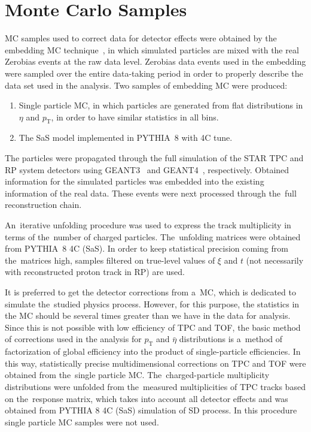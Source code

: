 \chapter{Monte Carlo Samples }\label{section:star_mc}
\ac{MC} samples used to correct data for detector effects were obtained by the embedding \ac{MC} technique~\cite{STAR:tpc}, in which  simulated particles are mixed with the real Zerobias events at the raw data level. Zerobias data events used in the embedding were sampled over the entire data-taking period in order to properly describe the data set used in the analysis.  Two samples of embedding MC were produced:
\begin{enumerate}
	\item Single particle \ac{MC}, in which particles are generated from flat distributions in $\eta$ and $p_\textrm{T}$, in order to have similar statistics in all bins.
	\item The \ac{SaS} model implemented in PYTHIA~8 with 4C tune. 
\end{enumerate}
The particles were propagated through the full simulation of the STAR TPC and RP system detectors using GEANT3~\cite{GEANT:three} and GEANT4~\cite{GEANT:four}, respectively. Obtained information for the simulated particles was embedded into the existing information of the real data. These events were next processed through the~full reconstruction chain. 

An~iterative unfolding procedure was used to express the track multiplicity in terms of the~number of charged particles.  The~unfolding matrices were obtained from PYTHIA~8 4C (\ac{SaS}). In order to keep statistical precision coming
from the~matrices high, samples filtered on true-level values of $\xi$ and $t$ (not necessarily with reconstructed proton track in RP) are used. 

It is preferred to get the detector corrections from a~MC, which is dedicated to simulate the~studied  physics process. However, for this purpose, the statistics in the MC should be several times greater than we have in the data for analysis. Since this is not possible with  low efficiency of TPC and TOF, the basic method of corrections used in the analysis for $p_\textrm{T}$ and $\bar{\eta}$ distributions is a~method of factorization of global efficiency into the product of single-particle efficiencies. In this way, statistically precise multidimensional corrections on TPC and TOF were obtained from the~single particle MC. %
The~charged-particle multiplicity distributions were unfolded from the~measured multiplicities of TPC tracks based on the~response matrix, which takes into account  all detector effects and was obtained from PYTHIA 8 4C (SaS) simulation of SD process. In this procedure single particle MC samples were not used.  



